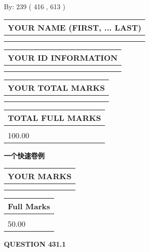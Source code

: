 \documentclass{ctexart}
\begin{document}
   
\hspace{1.0in} By: 
 239 ( 416 ,  613 )
   
   
   
   
\newpage 
\setcounter{page}{ 
   431001 } 
   
   
   
   
\noindent\begin{tabular}{|l|}
\hline
YOUR NAME (FIRST, ... LAST)  \\
\hline
 \\ 
 \\ 
\hline
\end{tabular}
\hspace{0.05in} \begin{tabular}{|l|}
\hline
 YOUR   ID   INFORMATION  \\
\hline
 \\ 
 \\ 
\hline
\end{tabular}
   
   
\vspace{0.2in}\noindent\begin{tabular}{|l|}
\hline
YOUR TOTAL MARKS  \\
\hline
 \\ 
 \\ 
\hline
\end{tabular}
\hspace{0.05in} \begin{tabular}{|l|}
\hline
TOTAL FULL MARKS  \\
\hline
 \\ 
100.00 \\
\hline
\end{tabular}
   
   
 \vspace{0.2in}
{\LARGE {\textbf{ 一个快速卷例}}}
   
   
  
\vspace{0.2in}
  
\noindent\begin{tabular}{|l|}
\hline
 YOUR MARKS  \\
\hline
 \\ 
 \\ 
\hline
\end{tabular}
\hspace{0.05in} \begin{tabular}{|l|}
\hline
 Full Marks  \\
\hline
 \\ 
50.00 \\
\hline
\end{tabular}
{\textbf{\Large{QUESTION
431.1 
}}}
  
\end{document}
